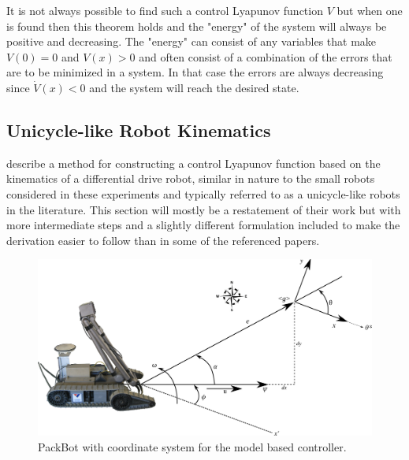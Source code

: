 It is not always possible to find such a control Lyapunov function $V$ but when one is found then this theorem holds and the "energy" of the system will always be positive and decreasing. The "energy" can consist of any variables that make $V(0) = 0$ and $V(x) > 0$ and often consist of a combination of the errors that are to be minimized in a system. In that case the errors are always decreasing since $\dot{V}(x) < 0$ and the system will reach the desired state.

\subsection{Unicycle-like Robot Kinematics}
\label{sec:unicycleKinematics}
\cite{Rusu05RobotuxLyapunov,Aicardi_UnicycleLyapunov95} describe a method for constructing a control Lyapunov function based on the kinematics of a differential drive robot, similar in nature to the small robots considered in these experiments and typically referred to as a unicycle-like robots in the literature. This section will mostly be a restatement of their work but with more intermediate steps and a slightly different formulation included to make the derivation easier to follow than in some of the referenced papers.

\begin{figure}[ht!]
	\centering
	\includegraphics[width=.95\textwidth]{images/packbotlyapunov}
	\caption{PackBot with coordinate system for the model based controller.}
	\label{fig:pblyapunov}
\end{figure}

